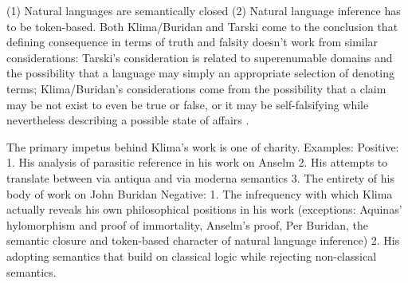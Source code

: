 \documentclass[]{article}
\begin{document}


(1) Natural languages are semantically closed (2) Natural language inference has to be token-based.
Both Klima/Buridan and Tarski come to the conclusion that defining consequence in terms of truth and falsity doesn't work from similar considerations: Tarski's consideration is related to superenumable domains and the possibility that a language may simply an appropriate selection of denoting terms; Klima/Buridan's considerations come from the possibility that a claim may be not exist to even be true or false, or it may be self-falsifying while nevertheless describing a possible state of affairs \autocite[96]{Klima2004}.

The primary impetus behind Klima's work is one of charity.
Examples: 
Positive:
1. His analysis of parasitic reference in his work on Anselm
2. His attempts to translate between via antiqua and via moderna semantics
3. The entirety of his body of work on John Buridan
Negative:
1. The infrequency with which Klima actually reveals his own philosophical positions in his work (exceptions: 
Aquinas' hylomorphism and proof of immortality, 
Anselm's proof, 
Per Buridan, the semantic closure and token-based character of natural language inference)
2. His adopting semantics that build on classical logic while rejecting non-classical semantics.


\end{document}
